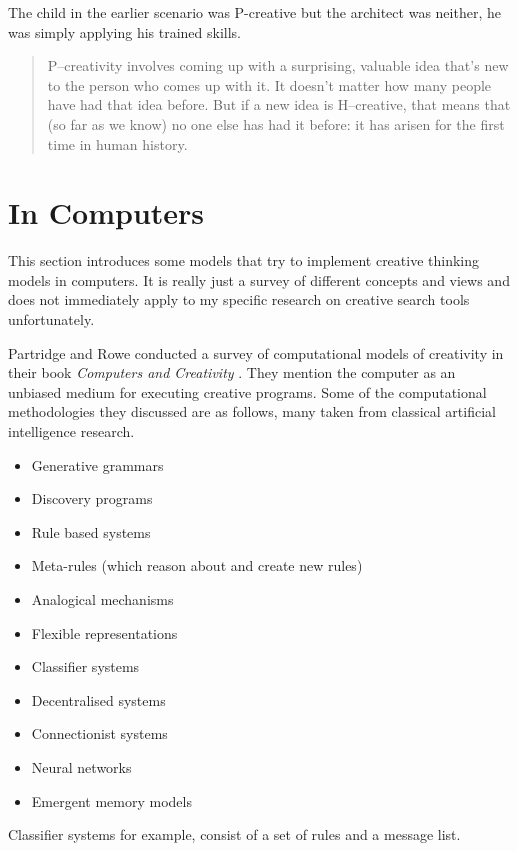 The child in the earlier scenario was P-creative but the architect was neither, he was simply applying his trained skills.

\begin{quotation}
	P–creativity involves coming up with a surprising, valuable idea that's new to the person who comes up with it. It doesn't matter how many people have had that idea before. But if a new idea is H–creative, that means that (so far as we know) no one else has had it before: it has arisen for the first time in human history. 
\end{quotation}


\section{In Computers}

This section introduces some models that try to implement creative thinking models in computers. It is really just a survey of different concepts and views and does not immediately apply to my specific research on creative search tools unfortunately.

Partridge and Rowe conducted a survey of computational models of creativity in their book \textit{Computers and Creativity} \citeyear{Partridge1994}. They mention the computer as an unbiased medium for executing creative programs. Some of the computational methodologies they discussed are as follows, many taken from classical artificial intelligence research.

\begin{itemize}
  \item Generative  grammars
  \item Discovery programs
  \item Rule based systems
  \item Meta-rules (which reason about and create new rules)
  \item Analogical mechanisms
  \item Flexible representations
  \item Classifier systems
  \item Decentralised systems
  \item Connectionist systems
  \item Neural networks
  \item Emergent memory models
\end{itemize}

Classifier systems for example, consist of a set of rules and a message list.

